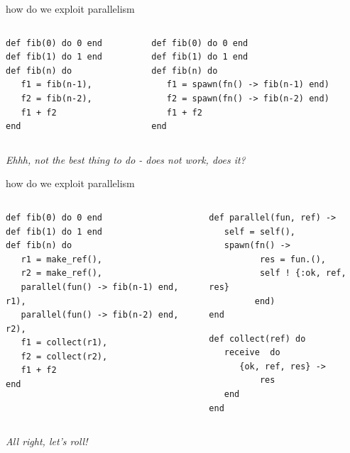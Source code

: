 \begin{frame}[fragile]{how do we exploit parallelism}

\begin{columns}
 \begin{column}{0.5\linewidth}
\begin{verbatim}
def fib(0) do 0 end
def fib(1) do 1 end
def fib(n) do
   f1 = fib(n-1),
   f2 = fib(n-2),
   f1 + f2
end
\end{verbatim}
 \end{column}
\pause
 \begin{column}{0.5\linewidth}
\begin{verbatim}
def fib(0) do 0 end
def fib(1) do 1 end
def fib(n) do
   f1 = spawn(fn() -> fib(n-1) end)
   f2 = spawn(fn() -> fib(n-2) end)
   f1 + f2
end
\end{verbatim}
 \end{column}
\end{columns}

\pause\vspace{20pt}
{\em Ehhh, not the best thing to do - does not work, does it?}

\end{frame}


\begin{frame}[fragile]{how do we exploit parallelism}

\begin{columns}
 \begin{column}{0.6\linewidth}
 \begin{verbatim}
def fib(0) do 0 end
def fib(1) do 1 end
def fib(n) do
   r1 = make_ref(),
   r2 = make_ref(),
   parallel(fun() -> fib(n-1) end, r1),
   parallel(fun() -> fib(n-2) end, r2),
   f1 = collect(r1),
   f2 = collect(r2),
   f1 + f2
end
\end{verbatim}
 \end{column}
\pause
 \begin{column}{0.4\linewidth}
\begin{verbatim}
def parallel(fun, ref) ->
   self = self(),
   spawn(fn() -> 
          res = fun.(), 
          self ! {:ok, ref, res}
         end)
end 
\end{verbatim}
\begin{verbatim}
def collect(ref) do
   receive  do
      {ok, ref, res} ->
          res
   end
end
\end{verbatim}
 \end{column}
\end{columns}

\pause\vspace{20pt}
{\em All right, let's roll!}

\end{frame}

